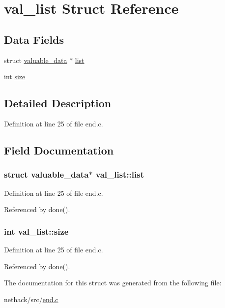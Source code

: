 \hypertarget{structval__list}{\section{val\+\_\+list Struct Reference}
\label{structval__list}
}
\subsection*{Data Fields}
\begin{DoxyCompactItemize}
\item 
struct \hyperlink{structvaluable__data}{valuable\+\_\+data} $\ast$ \hyperlink{structval__list_a16b694cc1b3306287c794316539a106c}{list}
\item 
int \hyperlink{structval__list_a5d57a0aa9b38d5fd6f8dc4efaae9a5df}{size}
\end{DoxyCompactItemize}


\subsection{Detailed Description}


Definition at line 25 of file end.\+c.



\subsection{Field Documentation}
\hypertarget{structval__list_a16b694cc1b3306287c794316539a106c}{
\subsubsection[{list}]{\setlength{\rightskip}{0pt plus 5cm}struct {\bf valuable\+\_\+data}$\ast$ val\+\_\+list\+::list}}\label{structval__list_a16b694cc1b3306287c794316539a106c}


Definition at line 25 of file end.\+c.



Referenced by done().

\hypertarget{structval__list_a5d57a0aa9b38d5fd6f8dc4efaae9a5df}{
\subsubsection[{size}]{\setlength{\rightskip}{0pt plus 5cm}int val\+\_\+list\+::size}}\label{structval__list_a5d57a0aa9b38d5fd6f8dc4efaae9a5df}


Definition at line 25 of file end.\+c.



Referenced by done().



The documentation for this struct was generated from the following file\+:\begin{DoxyCompactItemize}
\item 
nethack/src/\hyperlink{end_8c}{end.\+c}\end{DoxyCompactItemize}
